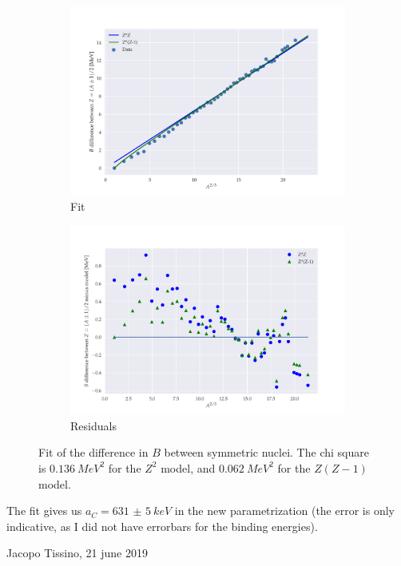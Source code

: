\documentclass{article}
\begin{document}
\begin{figure}[H]
    \centering
    \begin{subfigure}{0.5\textwidth}
        \includegraphics[width=\textwidth]{figures/odd_A_fit.pdf}
        \caption{Fit}
    \end{subfigure}%
    \begin{subfigure}{0.5\textwidth}
        \includegraphics[width=\textwidth]{figures/odd_A_residuals.pdf}
        \caption{Residuals}
    \end{subfigure}%
    \caption{Fit of the difference in \(B\) between symmetric nuclei. The chi square is \(\SI{0.136}{MeV^2} \) for the \(Z^2\) model, and \(\SI{0.062}{MeV^2}\) for the \(Z(Z-1)\) model.}
    \label{fig:odd-A-fit}
\end{figure}


The fit gives us \(a_C = \SI{631(5)}{keV}\) in the new parametrization (the error is only indicative, as I did not have errorbars for the binding energies).

\begin{flushright}
    Jacopo Tissino, 21 june 2019
\end{flushright}
\end{document}
